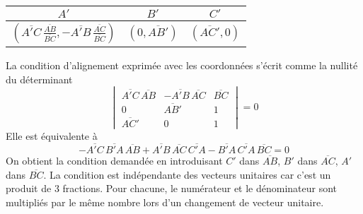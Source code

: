 \begin{enumerate}
\begin{center}
\renewcommand{\arraystretch}{1.5}
\begin{tabular}{|c|c|c|}
\hline
$A'$ & $B'$ & $C'$ \\ \hline
$(\overline{A'C}\,\frac{\overline{AB}}{\overline{BC}},-\overline{A'B}\,\frac{\overline{AC}}{\overline{BC}})$ 
& $(0,\overline{AB'})$ 
& $(\overline{AC'},0)$ \\ \hline 
\end{tabular} 
\end{center}
La condition d'alignement exprimée avec les coordonnées s'écrit comme la nullité du déterminant
\begin{displaymath}
  \begin{vmatrix}
    \overline{A'C} \,\overline{AB} & -\overline{A'B}\,\overline{AC} & \overline{BC} \\
    0 & \overline{AB'} & 1 \\
    \overline{AC'} & 0 & 1
  \end{vmatrix}
= 0
\end{displaymath}
Elle est équivalente à
\begin{displaymath}
  -\overline{A'C}\,\overline{B'A}\,\overline{AB}
  +\overline{A'B}\,\overline{AC}\,\overline{C'A}
  -\overline{B'A}\,\overline{C'A}\,\overline{BC} = 0
\end{displaymath}
On obtient la condition demandée en introduisant $C'$ dans $\overline{AB}$, $B'$ dans $\overline{AC}$, $A'$ dans $\overline{BC}$.\newline
La condition est indépendante des vecteurs unitaires car c'est un produit de 3 fractions. Pour chacune, le numérateur et le dénominateur sont multipliés par le même nombre lors d'un changement de vecteur unitaire.
\end{enumerate}
